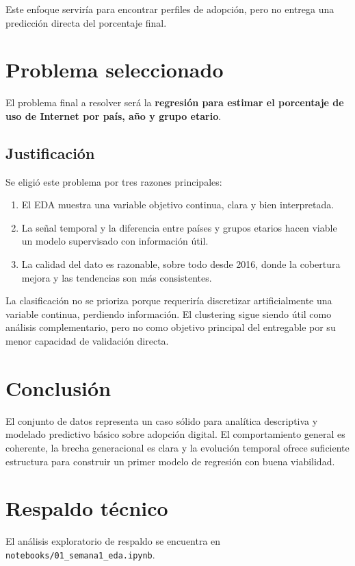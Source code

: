 \documentclass[12pt,a4paper]{article}
\begin{document}
Este enfoque serviría para encontrar perfiles de adopción, pero no entrega una predicción directa del porcentaje final.

\section{Problema seleccionado}

El problema final a resolver será la \textbf{regresión para estimar el porcentaje de uso de Internet por país, año y grupo etario}.

\subsection{Justificación}

Se eligió este problema por tres razones principales:

\begin{enumerate}
    \item El EDA muestra una variable objetivo continua, clara y bien interpretada.
    \item La señal temporal y la diferencia entre países y grupos etarios hacen viable un modelo supervisado con información útil.
    \item La calidad del dato es razonable, sobre todo desde 2016, donde la cobertura mejora y las tendencias son más consistentes.
\end{enumerate}

La clasificación no se prioriza porque requeriría discretizar artificialmente una variable continua, perdiendo información. El clustering sigue siendo útil como análisis complementario, pero no como objetivo principal del entregable por su menor capacidad de validación directa.

\section{Conclusión}

El conjunto de datos representa un caso sólido para analítica descriptiva y modelado predictivo básico sobre adopción digital. El comportamiento general es coherente, la brecha generacional es clara y la evolución temporal ofrece suficiente estructura para construir un primer modelo de regresión con buena viabilidad.

\section{Respaldo técnico}

El análisis exploratorio de respaldo se encuentra en \texttt{notebooks/01\_semana1\_eda.ipynb}.
\end{document}
